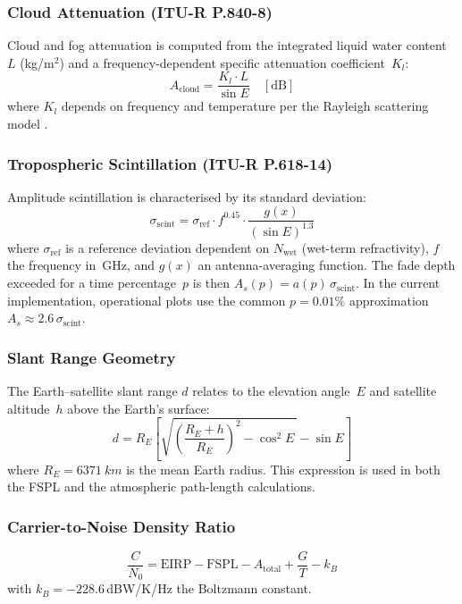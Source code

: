 \documentclass[telecom,article,submit,pdftex,moreauthors]{Definitions/mdpi}
\begin{document}
\subsubsection{Cloud Attenuation (ITU-R P.840-8)}
Cloud and fog attenuation is computed from the integrated liquid water
content~$L$ (kg/m$^2$) and a frequency-dependent specific attenuation
coefficient~$K_l$:
\begin{equation}
  A_{\text{cloud}} = \frac{K_l \cdot L}{\sin E}
  \quad [\text{dB}]
  \label{eq:cloud}
\end{equation}
where $K_l$ depends on frequency and temperature per the Rayleigh
scattering model \cite{itu_p840}.

\subsubsection{Tropospheric Scintillation (ITU-R P.618-14)}
Amplitude scintillation is characterised by its standard deviation:
\begin{equation}
  \sigma_{\text{scint}} = \sigma_{\text{ref}} \cdot f^{0.45}
    \cdot \frac{g(x)}{(\sin E)^{1.3}}
  \label{eq:scint}
\end{equation}
where $\sigma_{\text{ref}}$ is a reference deviation dependent on
$N_{\text{wet}}$ (wet-term refractivity), $f$ the frequency in~GHz,
and $g(x)$ an antenna-averaging function.  The fade depth exceeded for
a time percentage~$p$ is then $A_s(p) = a(p)\,\sigma_{\text{scint}}$.
In the current implementation, operational plots use the common
$p=0.01\%$ approximation $A_s \approx 2.6\,\sigma_{\text{scint}}$.

\subsubsection{Slant Range Geometry}
The Earth--satellite slant range $d$ relates to the elevation angle~$E$
and satellite altitude~$h$ above the Earth's surface:
\begin{equation}
  d = R_E\!\left[\sqrt{\left(\frac{R_E + h}{R_E}\right)^{\!2}
      - \cos^2\!E\,} - \sin E\right]
  \label{eq:slant}
\end{equation}
where $R_E = \SI{6371}{km}$ is the mean Earth radius.  This expression
is used in both the FSPL and the atmospheric path-length calculations.

\subsubsection{Carrier-to-Noise Density Ratio}
\begin{equation}
  \frac{C}{N_0} = \text{EIRP} - \text{FSPL} - A_{\text{total}}
                  + \frac{G}{T} - k_B
  \label{eq:cn0}
\end{equation}
with $k_B = -228.6$\,dBW/K/Hz the Boltzmann constant.
\end{document}
